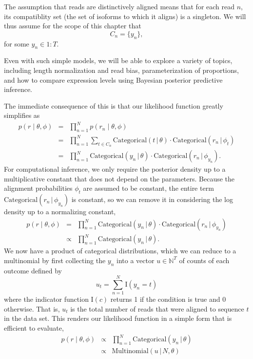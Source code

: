 \documentclass[11pt]{report}
\newcommand{\rngto}[1]{1{:}#1}
\newcommand{\setlist}[1]{\{ #1 \}}
\newcommand{\indicator}[1]{\textrm{I}\!\left( #1 \right)}
\newcommand{\distro}[3]{\textrm{#1}\!\left( #2 \,|\, #3\right)}
\begin{document}
The assumption that reads are distinctively aligned means that for
each read $n$, its compatiblity set (the set of isoforms to which it
aligns) is a singleton.  We will thus assume for the scope of
this chapter that
\[
  C_n = \setlist{y_n},
\]
for some $y_n \in \rngto{T}$.

Even with such simple models, we will be able to explore a variety of
topics, including length normalization and read bias, parameterization
of proportions, and how to compare expression levels using Bayesian
posterior predictive inference.

The immediate consequence of this is that our likelihood function
greatly simplifies as
\begin{eqnarray*}
  p(r \mid \theta, \phi)
  & = & \textstyle
        \prod_{n=1}^N p(r_n \mid \theta, \phi)
  \\[4pt]
  & = & \textstyle
        \prod_{n=1}^N \sum_{t \in C_n} \distro{Categorical}{t}{\theta}
        \cdot \distro{Categorical}{r_n}{\phi_t}
  \\[4pt]
  & = & \textstyle
        \prod_{n=1}^N \distro{Categorical}{y_n}{\theta}
        \cdot \distro{Categorical}{r_n}{\phi_{y_n}}.
\end{eqnarray*}
%
For computational inference, we only require the posterior density up
to a multiplicative constant that does not depend on the parameters.
Because the alignment probabilities $\phi_t$ are assumed to be
constant, the entire term $\distro{Categorical}{r_n}{\phi_{y_n}}$
is constant, so we can remove it in considering the log density up to
a normalizing constant,
%
\begin{eqnarray*}
   p(r \mid \theta, \phi)
  & = & \textstyle
        \prod_{n=1}^N \distro{Categorical}{y_n}{\theta}
        \cdot \distro{Categorical}{r_n}{\phi_{y_n}}
  \\[4pt]
  & \propto & \textstyle
              \prod_{n=1}^N \distro{Categorical}{y_n}{\theta}.
\end{eqnarray*}
%
We now have a product of categorical distributions, which we can
reduce to a multinomial by first collecting the $y_n$ into a vector
$u \in \mathbb{N}^T$ of
counts of each outcome defined by
\[
  u_t = \sum_{n=1}^N \indicator{y_n = t}
\]
where the indicator function $\indicator{c}$ returns 1 if the
condition is true and 0 otherwise.
That is, $u_t$ is the total number of reads that were aligned to
sequence $t$ in the data set.  This renders our likelihood function in
a simple form that is efficient to evaluate,
\begin{eqnarray*}
   p(r \mid \theta, \phi)
   & \propto & \textstyle
              \prod_{n=1}^N \distro{Categorical}{y_n}{\theta}
  \\[4pt]
              & \propto & \textstyle
  \distro{Multinomial}{u}{N, \theta}
\end{eqnarray*}
\end{document}
